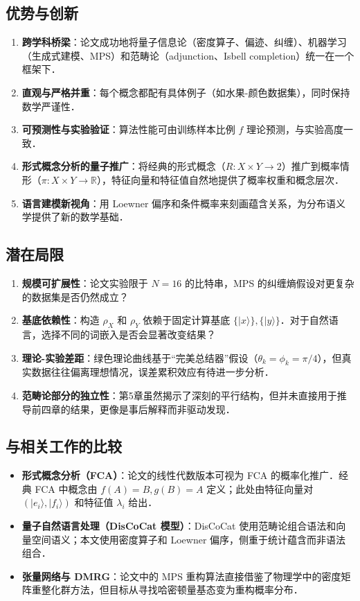\documentclass[10pt, openany]{book}
\begin{document}
\subsection{优势与创新}

\begin{enumerate}
    \item \textbf{跨学科桥梁}：论文成功地将量子信息论（密度算子、偏迹、纠缠）、机器学习（生成式建模、MPS）和范畴论（adjunction、Isbell completion）统一在一个框架下．
    \item \textbf{直观与严格并重}：每个概念都配有具体例子（如水果-颜色数据集），同时保持数学严谨性．
    \item \textbf{可预测性与实验验证}：算法性能可由训练样本比例 $f$ 理论预测，与实验高度一致．
    \item \textbf{形式概念分析的量子推广}：将经典的形式概念（$R: X\times Y \to 2$）推广到概率情形（$\pi: X\times Y \to \mathbb{R}$），特征向量和特征值自然地提供了概率权重和概念层次．
    \item \textbf{语言建模新视角}：用 Loewner 偏序和条件概率来刻画蕴含关系，为分布语义学提供了新的数学基础．
\end{enumerate}

\subsection{潜在局限}

\begin{enumerate}
    \item \textbf{规模可扩展性}：论文实验限于 $N=16$ 的比特串，MPS 的纠缠熵假设对更复杂的数据集是否仍然成立？
    \item \textbf{基底依赖性}：构造 $\rho_X$ 和 $\rho_Y$ 依赖于固定计算基底 $\{|x\rangle\}, \{|y\rangle\}$．对于自然语言，选择不同的词嵌入是否会显著改变结果？
    \item \textbf{理论-实验差距}：绿色理论曲线基于“完美总结器”假设（$\theta_k = \phi_k = \pi/4$），但真实数据往往偏离理想情况，误差累积效应有待进一步分析．
    \item \textbf{范畴论部分的独立性}：第5章虽然揭示了深刻的平行结构，但并未直接用于推导前四章的结果，更像是事后解释而非驱动发现．
\end{enumerate}

\subsection{与相关工作的比较}

\begin{itemize}
    \item \textbf{形式概念分析（FCA）}：论文的线性代数版本可视为 FCA 的概率化推广．经典 FCA 中概念由 $f(A)=B, g(B)=A$ 定义；此处由特征向量对 $(|e_i\rangle, |f_i\rangle)$ 和特征值 $\lambda_i$ 给出．
    \item \textbf{量子自然语言处理（DisCoCat 模型）}：DisCoCat 使用范畴论组合语法和向量空间语义；本文使用密度算子和 Loewner 偏序，侧重于统计蕴含而非语法组合．
    \item \textbf{张量网络与 DMRG}：论文中的 MPS 重构算法直接借鉴了物理学中的密度矩阵重整化群方法，但目标从寻找哈密顿量基态变为重构概率分布．
\end{itemize}
\end{document}
